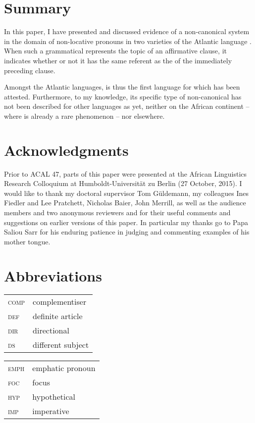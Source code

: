 \documentclass[output=paper,newtxmath,modfonts,nonflat,hidelinks]{langsci/langscibook}
\begin{document}
\section{Summary}\label{sec:apel:4}

In this paper, I have presented and discussed evidence of a non-canonical  system in the domain of non-locative   pronouns in two varieties of the Atlantic language . When such a grammatical  represents the topic of an affirmative clause, it indicates whether or not it has the same referent as the  of the immediately preceding clause.

Amongst the Atlantic languages,  is thus the first language for which  has been attested. Furthermore, to my knowledge, its specific type of non-canonical  has not been described for other languages as yet, neither on the African continent -- where  is already a rare phenomenon \citep[3]{Treis2012} -- nor elsewhere.

\section*{Acknowledgments}

Prior to ACAL 47, parts of this paper were presented at the African Linguistics Research Colloquium at Humboldt-Universität zu Berlin (27 October, 2015). I would like to thank my doctoral supervisor Tom Güldemann, my colleagues Ines Fiedler and Lee Pratchett, Nicholas Baier, John Merrill, as well as the audience members and two anonymous reviewers and for their useful comments and suggestions on earlier versions of this paper. In particular my thanks go to Papa Saliou Sarr for his enduring patience in judging and commenting examples of his mother tongue.

\section*{Abbreviations}

\begin{tabularx}{.45\textwidth}{>{\scshape}lQ}
comp & complementiser\\
 def & definite article\\
 dir & directional\\
 ds & different {subject}\\
\end{tabularx}
\begin{tabularx}{.45\textwidth}{>{\scshape}lQ}
 emph & emphatic {pronoun}\\
 foc & {focus}\\
 hyp & hypothetical\\
 imp & imperative\\ 
\end{tabularx}
\end{document}
